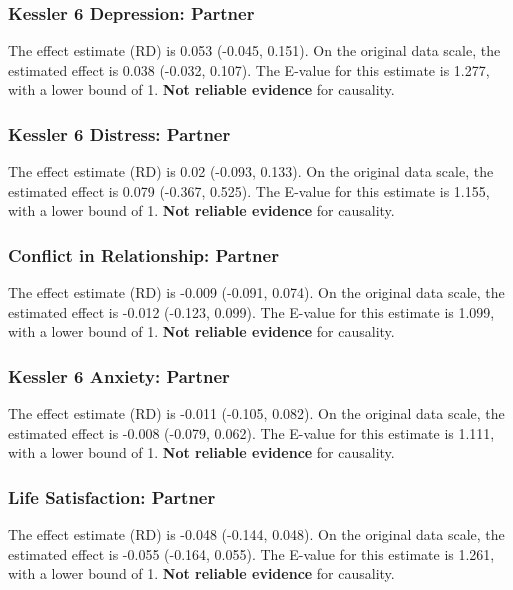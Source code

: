 \documentclass[
  singlecolumn]{article}
\begin{document}
\subsubsection{Kessler 6 Depression:
Partner}\label{kessler-6-depression-partner-12}

The effect estimate (RD) is 0.053 (-0.045, 0.151). On the original data
scale, the estimated effect is 0.038 (-0.032, 0.107). The E-value for
this estimate is 1.277, with a lower bound of 1. \textbf{Not reliable
evidence} for causality.

\subsubsection{Kessler 6 Distress:
Partner}\label{kessler-6-distress-partner-12}

The effect estimate (RD) is 0.02 (-0.093, 0.133). On the original data
scale, the estimated effect is 0.079 (-0.367, 0.525). The E-value for
this estimate is 1.155, with a lower bound of 1. \textbf{Not reliable
evidence} for causality.

\subsubsection{Conflict in Relationship:
Partner}\label{conflict-in-relationship-partner-12}

The effect estimate (RD) is -0.009 (-0.091, 0.074). On the original data
scale, the estimated effect is -0.012 (-0.123, 0.099). The E-value for
this estimate is 1.099, with a lower bound of 1. \textbf{Not reliable
evidence} for causality.

\subsubsection{Kessler 6 Anxiety:
Partner}\label{kessler-6-anxiety-partner-12}

The effect estimate (RD) is -0.011 (-0.105, 0.082). On the original data
scale, the estimated effect is -0.008 (-0.079, 0.062). The E-value for
this estimate is 1.111, with a lower bound of 1. \textbf{Not reliable
evidence} for causality.

\subsubsection{Life Satisfaction:
Partner}\label{life-satisfaction-partner-12}

The effect estimate (RD) is -0.048 (-0.144, 0.048). On the original data
scale, the estimated effect is -0.055 (-0.164, 0.055). The E-value for
this estimate is 1.261, with a lower bound of 1. \textbf{Not reliable
evidence} for causality.
\end{document}
